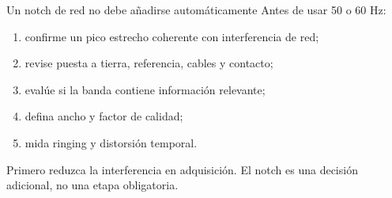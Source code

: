 \documentclass[
  ignorenonframetext,
  aspectratio=169,
  spanish,
  professionalfonts]{beamer}
\providecommand{\tightlist}{%
  \setlength{\itemsep}{0pt}\setlength{\parskip}{0pt}}
\begin{document}
\begin{frame}{Un notch de red no debe añadirse automáticamente}
\protect{}\label{un-notch-de-red-no-debe-auxf1adirse-automuxe1ticamente}
Antes de usar 50 o 60 Hz:

\begin{enumerate}
\tightlist
\item
  confirme un pico estrecho coherente con interferencia de red;
\item
  revise puesta a tierra, referencia, cables y contacto;
\item
  evalúe si la banda contiene información relevante;
\item
  defina ancho y factor de calidad;
\item
  mida ringing y distorsión temporal.
\end{enumerate}

\begin{tcolorbox}[enhanced jigsaw, arc=.35mm, bottomrule=.15mm, bottomtitle=1mm, breakable, colback=white, colbacktitle=quarto-callout-important-color!10!white, colframe=quarto-callout-important-color-frame, coltitle=black, left=2mm, leftrule=.75mm, opacityback=0, opacitybacktitle=0.6, rightrule=.15mm, title={Jerarquía de intervención}, titlerule=0mm, toprule=.15mm, toptitle=1mm]

Primero reduzca la interferencia en adquisición. El notch es una
decisión adicional, no una etapa obligatoria.

\end{tcolorbox}
\end{frame}
\end{document}
